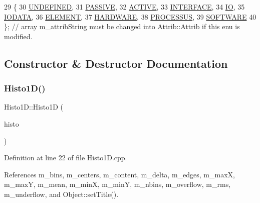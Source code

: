 \begin{DoxyCode}
29                 \{
30     \hyperlink{classAttrib_a69e171d7cc6417835a5a306d3c764235a3a8da2ab97dda18aebab196fe4100531}{UNDEFINED},
31     \hyperlink{classAttrib_a69e171d7cc6417835a5a306d3c764235a2bfb2af57b87031d190a05fe25dd92ed}{PASSIVE},
32     \hyperlink{classAttrib_a69e171d7cc6417835a5a306d3c764235a3b1fec929c0370d1436f2f06e298fb0d}{ACTIVE},
33     \hyperlink{classAttrib_a69e171d7cc6417835a5a306d3c764235aa27c16b480a369ea4d18b07b2516bbc7}{INTERFACE},
34     \hyperlink{classAttrib_a69e171d7cc6417835a5a306d3c764235a1420a5b8c0540b2af210b6975eded7f9}{IO},
35     \hyperlink{classAttrib_a69e171d7cc6417835a5a306d3c764235a0af3b0d0ac323c1704e6c69cf90add28}{IODATA},
36     \hyperlink{classAttrib_a69e171d7cc6417835a5a306d3c764235a7788bc5dd333fd8ce18562b269c9dab1}{ELEMENT},
37     \hyperlink{classAttrib_a69e171d7cc6417835a5a306d3c764235a61ceb22149f365f1780d18f9d1459423}{HARDWARE},
38     \hyperlink{classAttrib_a69e171d7cc6417835a5a306d3c764235a75250e29692496e73effca2c0330977f}{PROCESSUS},
39     \hyperlink{classAttrib_a69e171d7cc6417835a5a306d3c764235a103a67cd0b8f07ef478fa45d4356e27b}{SOFTWARE} 
40   \}; \textcolor{comment}{// array m\_attribString must be changed into Attrib::Attrib if this enu is modified. }
\end{DoxyCode}


\subsection{Constructor \& Destructor Documentation}
\mbox{\label{classHisto1D_aecd55af9b972863d5cee5a387746fb96}} 
\subsubsection{\texorpdfstring{Histo1\+D()}{Histo1D()}}
{\footnotesize\ttfamily Histo1\+D\+::\+Histo1D (\begin{DoxyParamCaption}\item[{T\+H1D $\ast$}]{histo }\end{DoxyParamCaption})}



Definition at line 22 of file Histo1\+D.\+cpp.



References m\+\_\+bins, m\+\_\+centers, m\+\_\+content, m\+\_\+delta, m\+\_\+edges, m\+\_\+maxX, m\+\_\+maxY, m\+\_\+mean, m\+\_\+minX, m\+\_\+minY, m\+\_\+nbins, m\+\_\+overflow, m\+\_\+rms, m\+\_\+underflow, and Object\+::set\+Title().


